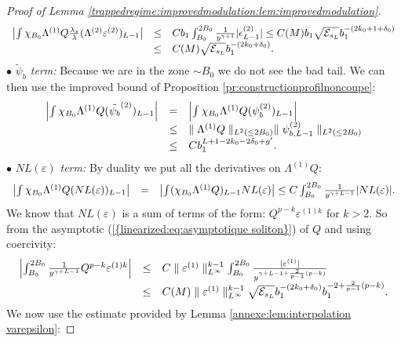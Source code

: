 \documentclass[11pt,a4paper,reqno]{amsart}
\theoremstyle{remark}
\numberwithin{equation}{section}
\begin{document}
\begin{proof}[Proof of Lemma \ref{trappedregime:improvedmodulation:lem:improvedmodulation}]
\begin{equation}
\begin{array}{r c l}
\left| \int\chi_{B_0}\Lambda^{(1)}Q \frac{\lambda_s}{\lambda} (\Lambda^{(2)}\varepsilon^{(2)})_{L-1} \right| &\leq& Cb_1 \int_{B_0}^{2B_0} \frac{1}{y^{\gamma+1}} |\epsilon^{(2)}_{L-1}| \leq C(M)b_1 \sqrt{\mathcal{E}_{s_L}} b_1^{-(2k_0+1+\delta_0)} \\
&\leq& C(M) \sqrt{\mathcal{E}_{s_L}} b_1^{-(2k_0+\delta_0)} .
\end{array}
\end{equation}
$\bullet$ \emph{$\tilde{\psi}_b$ term:} Because we are in the zone $\sim B_0$ we do not see the bad tail. We can then use the improved bound of Proposition \ref{pr:constructionprofilnoncoupe}:
\begin{equation} \label{thetrapped:eq:estimation premier terme improved intermediaire psib}
\begin{array}{r c l}
\left| \int \chi_{B_0}\Lambda^{(1)}Q (\tilde{\psi_b}^{(2)})_{L-1} \right| &=& \left| \int \chi_{B_0}\Lambda^{(1)}Q (\psi_b^{(2)})_{L-1} \right|\\
& \leq& \parallel \Lambda^{(1)} Q\parallel_{L^2(\leq 2B_0)} \parallel \psi_{b,L-1}^{(2)}\parallel_{L^2(\leq 2B_0)}\\
&\leq & C b_1^{L+1-2k_0-2\delta_0+g'} .
\end{array}
\end{equation}
$\bullet$ \emph{$NL(\varepsilon)$ term:} By duality we put all the derivatives on $\Lambda^{(1)}Q$:
$$
\begin{array}{r c l}
\left| \int \chi_{B_0} \Lambda^{(1)}Q (NL(\varepsilon))_{L-1}  \right|&=&\left| \int (\chi_{B_0} \Lambda^{(1)}Q)_{L-1} NL(\varepsilon)  \right| \leq C  \int_{B_0}^{2B_0} \frac{1}{y^{\gamma+L-1}} |NL(\varepsilon)| .
\end{array}
$$
We know that $NL(\varepsilon)$ is a sum of terms of the form: $Q^{p-k}\varepsilon^{(1)k}$ for $k>2$. So from the asymptotic {{\rm (\ref{{linearized:eq:asymptotique soliton}})}} of $Q$ and using coercivity:
$$
\begin{array}{r c l}
\left|\int_{B_0}^{2B_0} \frac{1}{y^{\gamma+L-1}}Q^{p-k}\varepsilon^{(1)k}\right| &\leq& C\parallel \varepsilon^{(1)} \parallel_{L^{\infty}}^{k-1} \int_{B_0}^{2B_0} \frac{|\varepsilon^{(1)}|}{y^{\gamma+L-1+\frac{2}{p-1}(p-k)}} \\
&\leq & C(M)\parallel \varepsilon^{(1)} \parallel_{L^{\infty}}^{k-1} \sqrt{\mathcal{E}_{s_L}} b_1^{-(2k_0+\delta_0)}b_1^{-2+\frac{2}{p-1}(p-k)} .
\end{array}
$$
We now use the estimate provided by Lemma \ref{annexe:lem:interpolation varepsilon}:

\end{proof}
\end{document}
